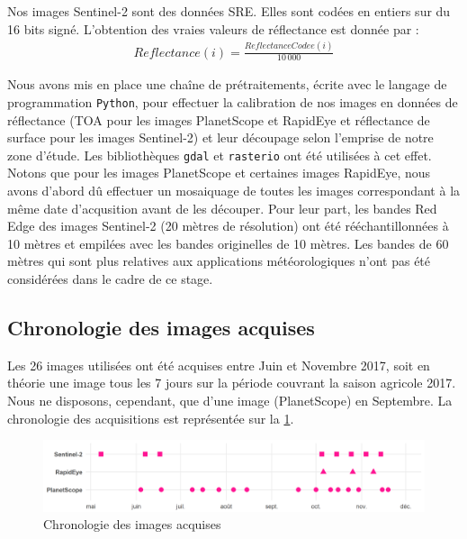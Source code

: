\vspace{5mm}

Nos images Sentinel-2 sont des données SRE. Elles sont codées en entiers sur du 16 bits signé. L'obtention des vraies valeurs de réflectance est donnée par :
\begin{align}
  Reflectance (i) =  \frac{ReflectanceCodee(i)}{10\,000}
\end{align}

\vspace{5mm}
 
Nous avons mis en place une chaîne de prétraitements, écrite avec le langage de programmation \texttt{Python}, pour effectuer la calibration de nos images en données de 
réflectance (TOA pour les images PlanetScope et RapidEye et réflectance de surface pour les images Sentinel-2) et leur découpage selon l'emprise de notre zone d'étude. 
Les bibliothèques \texttt{gdal} et \texttt{rasterio} ont été utilisées à cet effet. Notons que pour les images PlanetScope et certaines images RapidEye, nous avons d'abord dû 
effectuer un mosaiquage de toutes les images correspondant à la même date d'acqusition avant de les découper. Pour leur part, les bandes Red Edge des images Sentinel-2 (20 mètres 
de résolution) ont été rééchantillonnées à 10 mètres et empilées avec les bandes originelles de 10 mètres. Les bandes de 60 mètres qui sont plus relatives aux applications 
météorologiques n'ont pas été considérées dans le cadre de ce stage.

  \subsection{Chronologie des images acquises}
  
Les 26 images utilisées ont été acquises entre Juin et Novembre 2017, soit en théorie une image tous les 7 jours sur la période couvrant la saison agricole 2017. Nous ne disposons, cependant, que d'une image (PlanetScope) en Septembre. La chronologie des acquisitions est représentée sur la \cref{fig-Chronologie}.

\begin{figure}[htbp]
 \begin{center}
  \includegraphics[scale=0.7]{materiels_methodes/chronologie.png} 
 \end{center}
 \caption{Chronologie des images acquises}
  \label{fig-Chronologie}
\end{figure}


